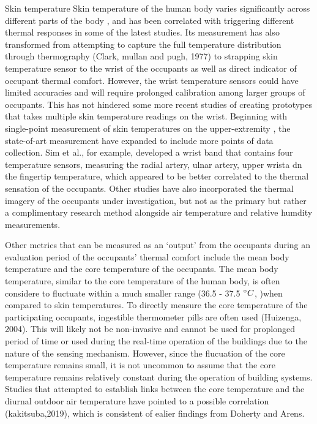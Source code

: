 	Skin temperature
	Skin temperature of the human body varies significantly across different parts of the body \cite{choi_cobi:_2010}, and has been correlated with triggering different thermal responses in some of the latest studies. Its measurement has also transformed from attempting to capture the full temperature distribution through thermography (Clark, mullan and pugh, 1977) to strapping skin temperature sensor to the wrist of the occupants \cite{choi_investigation_2017,liu_personal_2019} as well as direct indicator of occupant thermal comfort. However, the wrist temperature sensors could have limited accuracies \cite{mccarthy_validation_2016} and will require prolonged calibration among larger groups of occupants. This has not hindered some more recent studies of creating prototypes that takes multiple skin temperature readings on the wrist. Beginning with single-point measurement of skin temperatures on the upper-extremity \cite{wang_observations_2007}, the state-of-art measurement have expanded to include more points of data collection. Sim et al., for example, developed a wrist band that contains four temperature sensors, measuring the radial artery, ulnar artery, upper wrista dn the fingertip temperature, which appeared to be better correlated to the thermal sensation of the occupants. Other studies have also incorporated the thermal imagery of the occupants under investigation, but not as the primary but rather a complimentary research method alongside air temperature and relative humdity measurements\cite{lu_thermal_2019}. 

	Other metrics that can be measured as an `output' from the occupants during an evaluation period of the occupants' thermal comfort include the mean body temperature and the core temperature of the occupants. The mean body temperature, similar to the core temperature of the human body, is often considere to fluctuate within a much smaller range (36.5 - 37.5 $\degree C$, \cite{shapiro_environmental_1984})when compared to skin temperatures. To directly measure the core temperature of the participating occupants, ingestible thermometer pills are often used (Huizenga, 2004). This will likely not be non-invasive and cannot be used for proplonged period of time or used during the real-time operation of the buildings due to the nature of the sensing mechanism. However, since the flucuation of the core temperature remains small, it is not uncommon to assume that the core temperature remains relatively constant during the operation of building systems\cite{gagge_effective_1971}. Studies that attempted to establish links between the core temperature and the diurnal outdoor air temperature have pointed to a possible correlation (kakitsuba,2019), which is consistent of ealier findings from Doherty and Arens\cite{doherty_evaluation_1988}.

